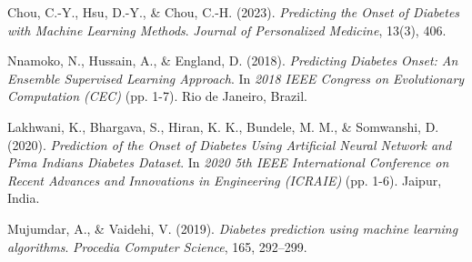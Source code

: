 \documentclass[a4paper,num-refs,gigabyte]{oup-contemporary}
\begin{document}
\begin{thebibliography}{99}
    
Chou, C.-Y., Hsu, D.-Y., \& Chou, C.-H. (2023).
\textit{Predicting the Onset of Diabetes with Machine Learning Methods}.
\textit{Journal of Personalized Medicine}, 13(3), 406.


Nnamoko, N., Hussain, A., \& England, D. (2018).
\textit{Predicting Diabetes Onset: An Ensemble Supervised Learning Approach}.
In \textit{2018 IEEE Congress on Evolutionary Computation (CEC)} (pp. 1-7). Rio de Janeiro, Brazil.


Lakhwani, K., Bhargava, S., Hiran, K. K., Bundele, M. M., \& Somwanshi, D. (2020).
\textit{Prediction of the Onset of Diabetes Using Artificial Neural Network and Pima Indians Diabetes Dataset}.
In \textit{2020 5th IEEE International Conference on Recent Advances and Innovations in Engineering (ICRAIE)} (pp. 1-6). Jaipur, India.

Mujumdar, A., \& Vaidehi, V. (2019).
\textit{Diabetes prediction using machine learning algorithms}.
\textit{Procedia Computer Science}, 165, 292--299.


\end{thebibliography}
\end{document}
